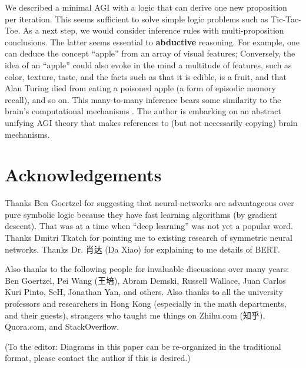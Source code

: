 \documentclass[orivec]{llncs}
\begin{document}
We described a minimal AGI with a logic that can derive one new proposition per iteration.  This seems sufficient to solve simple logic problems such as Tic-Tac-Toe.  As a next step, we would consider inference rules with multi-proposition conclusions.  The latter seems essential to \textbf{abductive} reasoning.  For example, one can deduce the concept ``apple'' from an array of visual features;  Conversely, the idea of an ``apple'' could also evoke in the mind a multitude of features, such as color, texture, taste, and the facts such as that it is edible, is a fruit, and that Alan Turing died from eating a poisoned apple (a form of episodic memory recall), and so on.  This many-to-many inference bears some similarity to the brain's computational mechanisms \cite{Rolls2016} \cite{Rolls2021} \cite{Boraud2020}.  The author is embarking on an abstract unifying AGI theory that makes references to (but not necessarily copying) brain mechanisms.

\section*{Acknowledgements}

Thanks Ben Goertzel for suggesting that neural networks are advantageous over pure symbolic logic because they have fast learning algorithms (by gradient descent).  That was at a time when ``deep learning'' was not yet a popular word.  Thanks Dmitri Tkatch for pointing me to existing research of symmetric neural networks.  Thanks Dr. 肖达 (Da Xiao) for explaining to me details of BERT. 

Also thanks to the following people for invaluable discussions over many years:  Ben Goertzel, Pei Wang (王培), Abram Demski, Russell Wallace, Juan Carlos Kuri Pinto, SeH, Jonathan Yan, and others.  Also thanks to all the university professors and researchers in Hong Kong (especially in the math departments, and their guests), strangers who taught me things on Zhihu.com (知乎), Quora.com, and StackOverflow.

\printbibliography

{\color{red}(To the editor:  Diagrams in this paper can be re-organized in the traditional format, please contact the author if this is desired.)}
\end{document}
